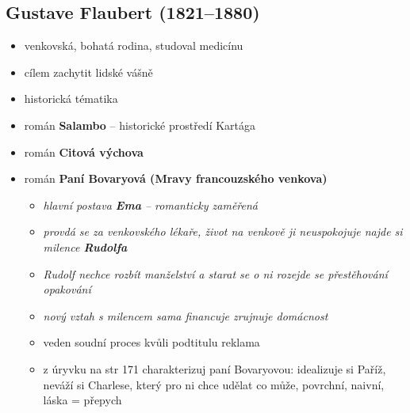 \subsection{Gustave Flaubert (1821--1880)}
\begin{itemize}
\item venkovská, bohatá rodina, studoval medicínu
\item cílem zachytit lidské vášně 
\item historická tématika
\item román \textbf{Salambo} -- historické prostředí Kartága
\item román \textbf{Citová výchova}
\item román \textbf{Paní Bovaryová (Mravy francouzského venkova)}
	\begin{itemize}
	\item \textit{hlavní postava \textbf{Ema} -- romanticky zaměřená}
	\item \textit{provdá se za venkovského lékaře, život na venkově ji neuspokojuje \ra najde si milence \textbf{Rudolfa}}
	\item \textit{Rudolf nechce rozbít manželství a starat se o ni \ra rozejde se \ra přestěhování \ra opakování}
	\item \textit{nový vztah s milencem sama financuje \ra zrujnuje domácnost}
	\item veden soudní proces kvůli podtitulu \ra reklama 
	\item z úryvku na str 171 charakterizuj paní Bovaryovou: idealizuje si Paříž, neváží si Charlese, který pro ni chce udělat co může, povrchní, naivní, láska = přepych
	\end{itemize}
\end{itemize}


